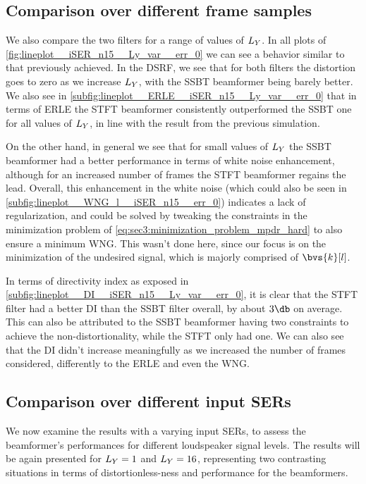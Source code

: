 \subsection{Comparison over different frame samples}
\label{subsec:sec4:comparison_different_Ly}

We also compare the two filters for a range of values of $\Ly$. In all plots of \cref{fig:lineplot__iSER_n15__Ly_var__err_0} we can see a behavior similar to that previously achieved. In the DSRF, we see that for both filters the distortion goes to zero as we increase $\Ly$, with the SSBT beamformer being barely better. We also see in \cref{subfig:lineplot__ERLE__iSER_n15__Ly_var__err_0} that in terms of ERLE the STFT beamformer consistently outperformed the SSBT one for all values of $\Ly$, in line with the result from the previous simulation.

On the other hand, in general we see that for small values of $\Ly$ the SSBT beamformer had a better performance in terms of white noise enhancement, although for an increased number of frames the STFT beamformer regains the lead. Overall, this enhancement in the white noise (which could also be seen in \cref{subfig:lineplot__WNG_l__iSER_n15__err_0}) indicates a lack of regularization, and could be solved by tweaking the constraints in the minimization problem of \cref{eq:sec3:minimization_problem_mpdr_hard} to also ensure a minimum WNG. This wasn't done here, since our focus is on the minimization of the undesired signal, which is majorly comprised of $\bvs{k}[l]$.

In terms of directivity index as exposed in \cref{subfig:lineplot__DI__iSER_n15__Ly_var__err_0}, it is clear that the STFT filter had a better DI than the SSBT filter overall, by about $3 \dB$ on average. This can also be attributed to the SSBT beamformer having two constraints to achieve the non-distortionality, while the STFT only had one. We can also see that the DI didn't increase meaningfully as we increased the number of frames considered, differently to the ERLE and even the WNG.

\subsection{Comparison over different input SERs}

We now examine the results with a varying input SERs, to assess the beamformer's performances for different loudspeaker signal levels. The results will be again presented for $\Ly = 1$ and $\Ly = 16$, representing two contrasting situations in terms of distortionless-ness and performance for the beamformers.

